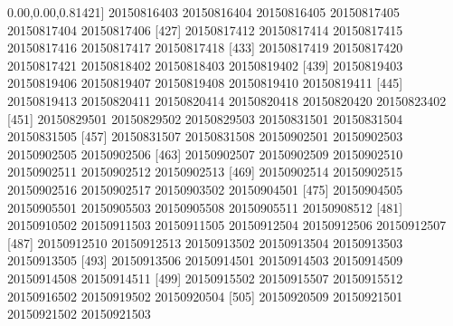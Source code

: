 \documentclass[
]{book}
\newenvironment{Shaded}{\begin{snugshade}}{\end{snugshade}}
\newcommand{\DecValTok}[1]{\textcolor[rgb]{0.00,0.00,0.81}{#1}}
\newcommand{\NormalTok}[1]{#1}
\begin{document}
\begin{Shaded}
\begin{Highlighting}[]
\NormalTok{[}\DecValTok{421}\NormalTok{] }\DecValTok{20150816403} \DecValTok{20150816404} \DecValTok{20150816405} \DecValTok{20150817405} \DecValTok{20150817404} \DecValTok{20150817406}
\NormalTok{[}\DecValTok{427}\NormalTok{] }\DecValTok{20150817412} \DecValTok{20150817414} \DecValTok{20150817415} \DecValTok{20150817416} \DecValTok{20150817417} \DecValTok{20150817418}
\NormalTok{[}\DecValTok{433}\NormalTok{] }\DecValTok{20150817419} \DecValTok{20150817420} \DecValTok{20150817421} \DecValTok{20150818402} \DecValTok{20150818403} \DecValTok{20150819402}
\NormalTok{[}\DecValTok{439}\NormalTok{] }\DecValTok{20150819403} \DecValTok{20150819406} \DecValTok{20150819407} \DecValTok{20150819408} \DecValTok{20150819410} \DecValTok{20150819411}
\NormalTok{[}\DecValTok{445}\NormalTok{] }\DecValTok{20150819413} \DecValTok{20150820411} \DecValTok{20150820414} \DecValTok{20150820418} \DecValTok{20150820420} \DecValTok{20150823402}
\NormalTok{[}\DecValTok{451}\NormalTok{] }\DecValTok{20150829501} \DecValTok{20150829502} \DecValTok{20150829503} \DecValTok{20150831501} \DecValTok{20150831504} \DecValTok{20150831505}
\NormalTok{[}\DecValTok{457}\NormalTok{] }\DecValTok{20150831507} \DecValTok{20150831508} \DecValTok{20150902501} \DecValTok{20150902503} \DecValTok{20150902505} \DecValTok{20150902506}
\NormalTok{[}\DecValTok{463}\NormalTok{] }\DecValTok{20150902507} \DecValTok{20150902509} \DecValTok{20150902510} \DecValTok{20150902511} \DecValTok{20150902512} \DecValTok{20150902513}
\NormalTok{[}\DecValTok{469}\NormalTok{] }\DecValTok{20150902514} \DecValTok{20150902515} \DecValTok{20150902516} \DecValTok{20150902517} \DecValTok{20150903502} \DecValTok{20150904501}
\NormalTok{[}\DecValTok{475}\NormalTok{] }\DecValTok{20150904505} \DecValTok{20150905501} \DecValTok{20150905503} \DecValTok{20150905508} \DecValTok{20150905511} \DecValTok{20150908512}
\NormalTok{[}\DecValTok{481}\NormalTok{] }\DecValTok{20150910502} \DecValTok{20150911503} \DecValTok{20150911505} \DecValTok{20150912504} \DecValTok{20150912506} \DecValTok{20150912507}
\NormalTok{[}\DecValTok{487}\NormalTok{] }\DecValTok{20150912510} \DecValTok{20150912513} \DecValTok{20150913502} \DecValTok{20150913504} \DecValTok{20150913503} \DecValTok{20150913505}
\NormalTok{[}\DecValTok{493}\NormalTok{] }\DecValTok{20150913506} \DecValTok{20150914501} \DecValTok{20150914503} \DecValTok{20150914509} \DecValTok{20150914508} \DecValTok{20150914511}
\NormalTok{[}\DecValTok{499}\NormalTok{] }\DecValTok{20150915502} \DecValTok{20150915507} \DecValTok{20150915512} \DecValTok{20150916502} \DecValTok{20150919502} \DecValTok{20150920504}
\NormalTok{[}\DecValTok{505}\NormalTok{] }\DecValTok{20150920509} \DecValTok{20150921501} \DecValTok{20150921502} \DecValTok{20150921503}
\end{Highlighting}
\end{Shaded}
\end{document}
